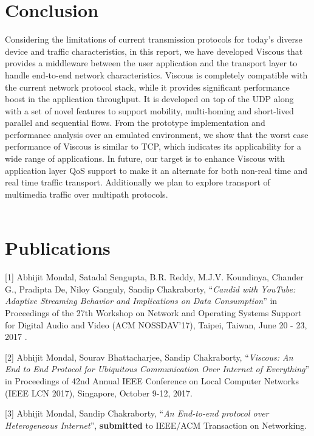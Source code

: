 \section{Conclusion}
Considering the limitations of current transmission protocols for today’s diverse device and traffic characteristics, in this report, we have developed Viscous that provides a middleware between the user application and the transport layer to handle end-to-end network characteristics. Viscous is completely compatible with the current network protocol stack, while it provides significant performance boost in the application throughput. It is developed on top of the UDP along with a set of novel features to support mobility, multi-homing and short-lived parallel and sequential flows. From the prototype implementation and performance analysis over an emulated environment, we show that the worst case performance of Viscous is similar to TCP, which indicates its applicability for a wide range of applications. 
In future, our target is to enhance Viscous with application layer QoS support to make it an alternate for both non-real time and real time traffic transport.  Additionally we plan to explore transport of multimedia traffic over multipath protocols. 
\\
\\
\section*{Publications}
[1] Abhijit Mondal, Satadal Sengupta, B.R. Reddy, M.J.V. Koundinya, Chander G., Pradipta De, Niloy Ganguly, Sandip Chakraborty, ``\textit{Candid with YouTube: Adaptive Streaming Behavior and Implications on Data Consumption}'' in Proceedings of the 27th Workshop on Network and Operating Systems Support for Digital Audio and Video (ACM NOSSDAV'17), Taipei, Taiwan, June 20 - 23, 2017 .

[2] Abhijit Mondal, Sourav Bhattacharjee, Sandip Chakraborty, ``\textit{Viscous: An End to End Protocol for Ubiquitous Communication Over Internet of Everything}'' in Proceedings of 42nd Annual IEEE Conference on Local Computer Networks (IEEE LCN 2017), Singapore, October 9-12, 2017.

[3] Abhijit Mondal, Sandip Chakraborty, ``\textit{An End-to-end protocol over Heterogeneous Internet}'', \textbf{submitted} to IEEE/ACM Transaction on Networking.
\\
\\